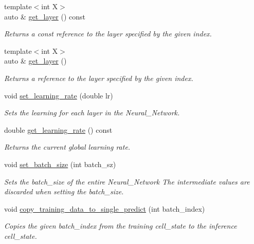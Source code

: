 \begin{DoxyCompactItemize}
{\footnotesize template$<$int X$>$ }\\auto \& \hyperlink{structbc_1_1nn_1_1NeuralNetwork_abac51be609275fbafb7786530f1ffec9}{get\+\_\+layer} () const
\begin{DoxyCompactList}\small\item\em Returns a const reference to the layer specified by the given index. \end{DoxyCompactList}\item 
{\footnotesize template$<$int X$>$ }\\auto \& \hyperlink{structbc_1_1nn_1_1NeuralNetwork_a99f24e40c4a36e62896e27ee84040af2}{get\+\_\+layer} ()
\begin{DoxyCompactList}\small\item\em Returns a reference to the layer specified by the given index. \end{DoxyCompactList}\item 
void \hyperlink{structbc_1_1nn_1_1NeuralNetwork_ab8b712ee3726a715990a22b392e07147}{set\+\_\+learning\+\_\+rate} (double lr)
\begin{DoxyCompactList}\small\item\em Sets the learning for each layer in the Neural\+\_\+\+Network. \end{DoxyCompactList}\item 
double \hyperlink{structbc_1_1nn_1_1NeuralNetwork_a05de79606c5922a8bf12aa4b2f5a00b9}{get\+\_\+learning\+\_\+rate} () const
\begin{DoxyCompactList}\small\item\em Returns the current global learning rate. \end{DoxyCompactList}\item 
void \hyperlink{structbc_1_1nn_1_1NeuralNetwork_a571b56d5df7236d38614b7cedaeb43ab}{set\+\_\+batch\+\_\+size} (int batch\+\_\+sz)
\begin{DoxyCompactList}\small\item\em Sets the batch\+\_\+size of the entire Neural\+\_\+\+Network The intermediate values are discarded when setting the batch\+\_\+size. \end{DoxyCompactList}\item 
void \hyperlink{structbc_1_1nn_1_1NeuralNetwork_acb6527b25dade7c62d27dcddfed04a2c}{copy\+\_\+training\+\_\+data\+\_\+to\+\_\+single\+\_\+predict} (int batch\+\_\+index)
\begin{DoxyCompactList}\small\item\em Copies the given batch\+\_\+index from the training cell\+\_\+state to the inference cell\+\_\+state. \end{DoxyCompactList}\item 

\end{DoxyCompactItemize}

